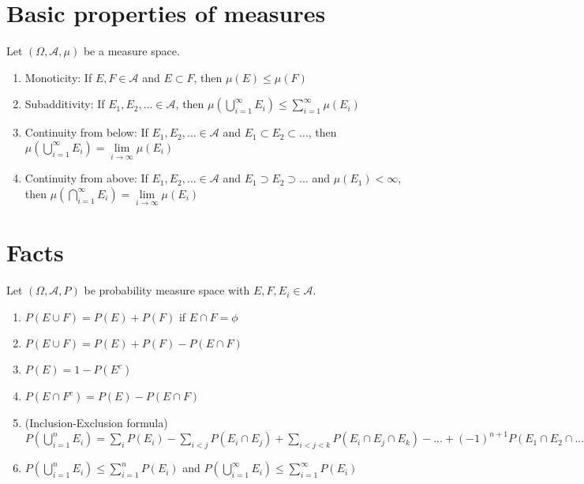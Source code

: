 \documentclass[12pt]{article}
\newcommand{\A}{\mathcal{A}}
\begin{document}
\section{Basic properties of measures}

Let $(\Omega,\A,\mu)$ be a measure space.

\begin{enumerate}
    \item Monoticity: If $E,F\in\A$ and $E\subset F$, then $\mu(E)\le\mu(F)$
    \item Subadditivity: If $E_1,E_2,...\in\A$, then
        $\mu(\bigcup\limits_{i=1}^{\infty} E_i)\le \sum\limits_{i=1}^{\infty} \mu(E_i)$

    \item Continuity from below: If $E_1,E_2,...\in\A$ and $E_1\subset E_2\subset ...$,
        then $\mu(\bigcup\limits_{i=1}^{\infty} E_i)=\lim\limits_{i\rightarrow\infty} \mu(E_i)$

    \item Continuity from above: If $E_1,E_2,...\in\A$ and $E_1\supset E_2\supset ...$
        and $\mu(E_1)<\infty$, then
        $\mu(\bigcap\limits_{i=1}^{\infty} E_i)=\lim\limits_{i\rightarrow\infty} \mu(E_i)$
\end{enumerate}

\section{Facts}

Let $(\Omega,\A,P)$ be probability measure space with $E,F,E_i\in\A$.

\begin{enumerate}
    \item $P(E\cup F)=P(E)+P(F)$ if $E\cap F=\phi$
    \item $P(E\cup F)=P(E)+P(F)-P(E\cap F)$
    \item $P(E)=1-P(E^c)$
    \item $P(E\cap F^c)=P(E) - P(E\cap F)$
    \item (Inclusion-Exclusion formula)
        $P(\bigcup\limits_{i=1}^{n} E_i)=\sum\limits_{i} P(E_i) - \sum\limits_{i<j} P(E_i\cap E_j) 
        + \sum\limits_{i<j<k} P(E_i\cap E_j\cap E_k) - ... + (-1)^{n+1}P(E_1\cap E_2\cap ... \cap E_n)$

    \item $P(\bigcup\limits_{i=1}^{n} E_i)\le \sum\limits_{i=1}^{n} P(E_i)$ and
          $P(\bigcup\limits_{i=1}^{\infty} E_i)\le \sum\limits_{i=1}^{\infty} P(E_i)$
\end{enumerate}
\end{document}
